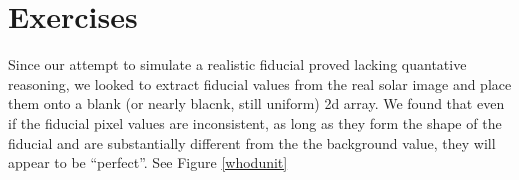 \documentclass[10pt]{article}
\begin{document}
\newpage

\section{Exercises}
    Since our attempt to simulate a realistic fiducial proved lacking quantative reasoning, we looked to extract fiducial values from the real solar image and place them onto a blank (or nearly blacnk, still uniform) 2d array. We found that even if the fiducial pixel values are inconsistent, as long as they form the shape of the fiducial and are substantially different from the the background value, they will appear to be ``perfect''. See Figure \ref{whodunit}

\begin{figure}[!ht]
    \centering
\end{figure}
\end{document}
